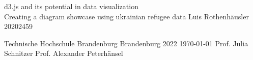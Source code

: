 \newcommand{\THBTitle}[9]{

  \thispagestyle{empty}
  \vspace*{\stretch{1}}
  {\parindent0cm
  \rule{\linewidth}{.7ex}}
  \begin{flushright}
    \vspace*{\stretch{1}}
    \sffamily\bfseries\Huge
    #1\\
    \vspace*{\stretch{1}}
    \sffamily\bfseries\large
    #2\\
    \vspace*{\stretch{1}}
    \sffamily\bfseries\small
    #3
  \end{flushright}
  \rule{\linewidth}{.7ex}

  \vspace*{\stretch{1}}
  \begin{center}
    \texttt{[image: figs/2015\_10\_05\_THB\_FB-IM\_Logo\_RGB]} \\
    \vspace*{\stretch{1}}
    \Large  Bachelorarbeit\\

    \vspace*{\stretch{2}}
   \large Fachbereich Informatik\\
    \large und Medien\\
    \large Technische Hochschule Brandenburg\\
    \vspace*{\stretch{1}}
    \large Betreuer:  #8 \\[1mm]
    \large 2. Betreuer:  #9 \\[1mm]
    
    \vspace*{\stretch{1}}
    \large Brandenburg, den #7 \\
        \vspace*{\stretch{0.25}}

    Bearbeitungszeit: 07.07.2022 - 01.09.2022 %

  \end{center}
}

\THBTitle
      {d3.js and its potential in data visualization\\
      \large Creating a diagram showcase using ukrainian refugee data}        %
      {Luis Rothenh\"ausler}                        %
      {20202459}
      
      {Technische Hochschule Brandenburg}  %
      {Brandenburg 2022}                          %
      {\today{}}                              %
      {Prof. Julia Schnitzer}               %
      {Prof. Alexander Peterhänsel}                          %